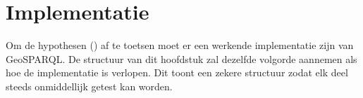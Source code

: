 \chapter{Implementatie}
\label{chap:implementatie}
Om de hypothesen () af te toetsen moet er een werkende implementatie zijn van GeoSPARQL. De structuur van dit hoofdstuk zal dezelfde volgorde aannemen als hoe de implementatie is verlopen. Dit toont een zekere structuur zodat elk deel steeds onmiddellijk getest kan worden. 


 
\newpage
 
\newpage
 
\newpage
 
\newpage
 
\newpage
 
\newpage
 
\newpage